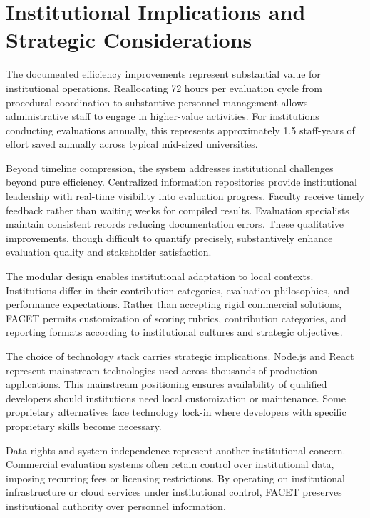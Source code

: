\documentclass[conference]{IEEEtran}
\begin{document}
\section{Institutional Implications and Strategic Considerations}
\label{sec:discussion}

The documented efficiency improvements represent substantial value for institutional operations. Reallocating 72 hours per evaluation cycle from procedural coordination to substantive personnel management allows administrative staff to engage in higher-value activities. For institutions conducting evaluations annually, this represents approximately 1.5 staff-years of effort saved annually across typical mid-sized universities.

Beyond timeline compression, the system addresses institutional challenges beyond pure efficiency. Centralized information repositories provide institutional leadership with real-time visibility into evaluation progress. Faculty receive timely feedback rather than waiting weeks for compiled results. Evaluation specialists maintain consistent records reducing documentation errors. These qualitative improvements, though difficult to quantify precisely, substantively enhance evaluation quality and stakeholder satisfaction.

The modular design enables institutional adaptation to local contexts. Institutions differ in their contribution categories, evaluation philosophies, and performance expectations. Rather than accepting rigid commercial solutions, FACET permits customization of scoring rubrics, contribution categories, and reporting formats according to institutional cultures and strategic objectives.

The choice of technology stack carries strategic implications. Node.js and React represent mainstream technologies used across thousands of production applications. This mainstream positioning ensures availability of qualified developers should institutions need local customization or maintenance. Some proprietary alternatives face technology lock-in where developers with specific proprietary skills become necessary.

Data rights and system independence represent another institutional concern. Commercial evaluation systems often retain control over institutional data, imposing recurring fees or licensing restrictions. By operating on institutional infrastructure or cloud services under institutional control, FACET preserves institutional authority over personnel information.
\end{document}
